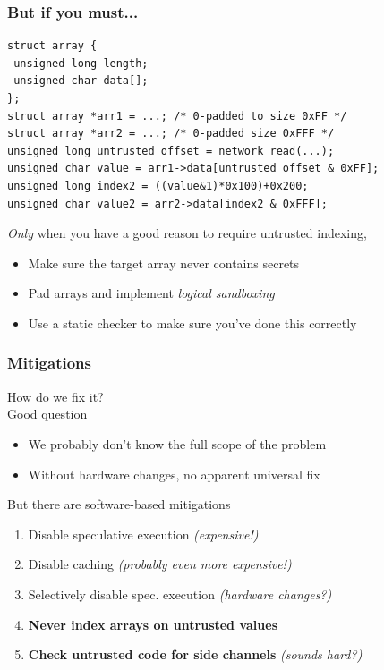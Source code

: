 \documentclass[10pt,handout]{beamer}
\begin{document}

\begin{frame}[fragile]

\frametitle{But if you must...}

\begin{lstlisting}[basicstyle=\small,style=customjava]
struct array {
 unsigned long length;
 unsigned char data[];
};
struct array *arr1 = ...; /* 0-padded to size 0xFF */
struct array *arr2 = ...; /* 0-padded size 0xFFF */
unsigned long untrusted_offset = network_read(...);
unsigned char value = arr1->data[untrusted_offset & 0xFF];
unsigned long index2 = ((value&1)*0x100)+0x200;
unsigned char value2 = arr2->data[index2 & 0xFFF];
\end{lstlisting}

\vspace*{1em}
\emph{Only} when you have a good reason to require untrusted indexing,
\begin{itemize}
\pause\item Make sure the target array never contains secrets
\pause\item Pad arrays and implement \emph{logical sandboxing}
\pause\item Use a static checker to make sure you've done this correctly
\end{itemize}

\end{frame}


\begin{frame}

\frametitle{Mitigations}

How do we fix it?
\\[1em]

Good question
\begin{itemize}
\item We probably don't know the full scope of the problem
\item Without hardware changes, no apparent universal fix\\[1em]
\end{itemize}

But there are software-based mitigations
\begin{enumerate}
  \item Disable speculative execution \emph{(expensive!)}
  \item Disable caching \emph{(probably even more expensive!)}
  \item Selectively disable spec. execution \emph{(hardware changes?)}
  \item \textbf{Never index arrays on untrusted values}
  \pause \item \textbf{Check untrusted code for side channels} \pause \emph{(sounds hard?)}
\end{enumerate}

\end{frame}
\end{document}
